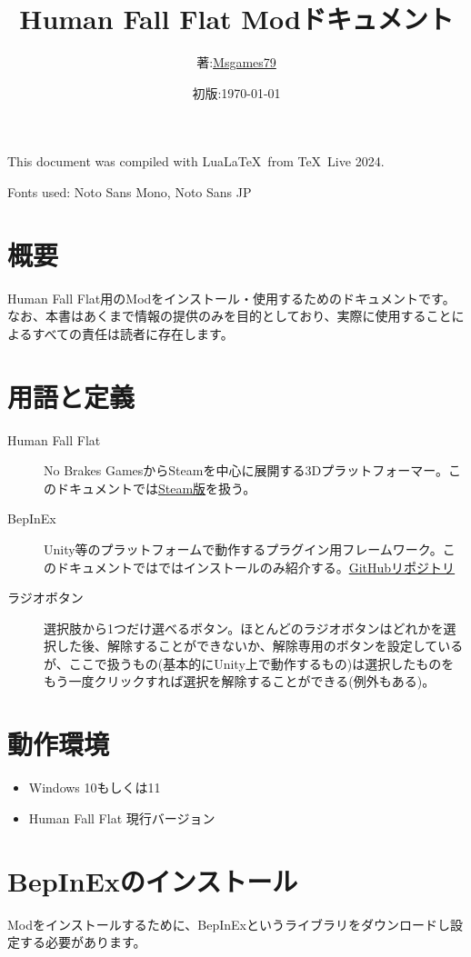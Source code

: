 \documentclass[lualatex,a4paper,fontsize=11pt,jafontscale=0.9247,titlepage,oneside]{jlreq}
\begin{document}
\title{Human Fall Flat Modドキュメント}
\author{著:\;\href{https://www.youtube.com/channel/UCKpnq5EXLCcuPsEGAjyXbsg}{Msgames79}}
\date{初版:\;\today}
\maketitle
This document was compiled with Lua\LaTeX\ from \TeX\ Live 2024.\par
Fonts used: Noto Sans Mono, Noto Sans JP
\tableofcontents
\clearpage
\section{概要}
Human Fall Flat用のModをインストール・使用するためのドキュメントです。なお、本書はあくまで情報の提供のみを目的としており、実際に使用することによるすべての責任は読者に存在します。
\section{用語と定義}
\begin{description}
\item[Human Fall Flat]No Brakes GamesからSteamを中心に展開する3Dプラットフォーマー。このドキュメントでは\href{https://store.steampowered.com/app/477160}{Steam版}を扱う。
\item[BepInEx]Unity等のプラットフォームで動作するプラグイン用フレームワーク。このドキュメントではではインストールのみ紹介する。\href{https://github.com/BepInEx/BepInEx}{GitHubリポジトリ}
\item[ラジオボタン]選択肢から1つだけ選べるボタン。ほとんどのラジオボタンはどれかを選択した後、解除することができないか、解除専用のボタンを設定しているが、ここで扱うもの(基本的にUnity上で動作するもの)は選択したものをもう一度クリックすれば選択を解除することができる(例外もある)。
\end{description}
\section{動作環境}
\begin{itemize}
\item Windows 10もしくは11
\item Human Fall Flat 現行バージョン
\end{itemize}
\section{BepInExのインストール}
Modをインストールするために、BepInExというライブラリをダウンロードし設定する必要があります。
\end{document}
